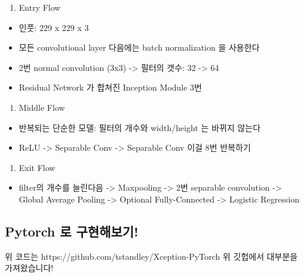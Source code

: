 \documentclass[11pt]{article}
\providecommand{\tightlist}{%
      \setlength{\itemsep}{0pt}\setlength{\parskip}{0pt}}
\begin{document}
\begin{enumerate}
\def\labelenumi{\arabic{enumi}.}
\tightlist
\item
  Entry Flow
\end{enumerate}

\begin{itemize}
\tightlist
\item
  인풋: 229 x 229 x 3
\item
  모든 convolutional layer 다음에는 batch normalization 을 사용한다
\item
  2번 normal convolution (3x3) -\textgreater{} 필터의 갯수: 32
  -\textgreater{} 64
\item
  Residual Network 가 합쳐진 Inception Module 3번
\end{itemize}

\begin{enumerate}
\def\labelenumi{\arabic{enumi}.}
\setcounter{enumi}{1}
\tightlist
\item
  Middle Flow
\end{enumerate}

\begin{itemize}
\tightlist
\item
  반복되는 단순한 모델: 필터의 개수와 width/height 는 바뀌지 않는다
\item
  ReLU -\textgreater{} Separable Conv -\textgreater{} Separable Conv
  이걸 8번 반복하기
\end{itemize}

\begin{enumerate}
\def\labelenumi{\arabic{enumi}.}
\setcounter{enumi}{2}
\tightlist
\item
  Exit Flow
\end{enumerate}

\begin{itemize}
\tightlist
\item
  filter의 개수를 늘린다음 -\textgreater{} Maxpooling -\textgreater{}
  2번 separable convolution -\textgreater{} Global Average Pooling
  -\textgreater{} Optional Fully-Connected -\textgreater{} Logistic
  Regression
\end{itemize}

    \subsection{Pytorch 로
구현해보기!}\label{pytorch-uxb85c-uxad6cuxd604uxd574uxbcf4uxae30}

위 코드는 https://github.com/tstandley/Xception-PyTorch 위 깃헙에서
대부분을 가져왔습니다!
\end{document}
